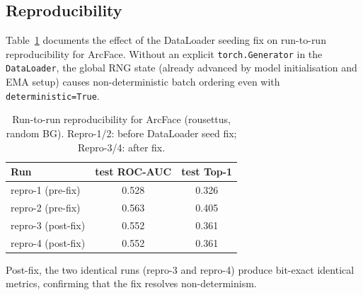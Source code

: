 \subsection{Reproducibility}

Table~\ref{tab:repro} documents the effect of the DataLoader seeding fix on run-to-run
reproducibility for ArcFace.  Without an explicit \texttt{torch.Generator} in the
\texttt{DataLoader}, the global RNG state (already advanced by model initialisation and
EMA setup) causes non-deterministic batch ordering even with \texttt{deterministic=True}.

\begin{table}[h]
\centering
\caption{Run-to-run reproducibility for ArcFace (rousettus, random BG).
Repro-1/2: before DataLoader seed fix; Repro-3/4: after fix.}
\label{tab:repro}
\begin{tabular}{lcc}
\toprule
Run & test ROC-AUC & test Top-1 \\
\midrule
repro-1 (pre-fix)   & 0.528 & 0.326 \\
repro-2 (pre-fix)   & 0.563 & 0.405 \\
repro-3 (post-fix)  & 0.552 & 0.361 \\
repro-4 (post-fix)  & 0.552 & 0.361 \\
\bottomrule
\end{tabular}
\end{table}

Post-fix, the two identical runs (repro-3 and repro-4) produce bit-exact identical metrics,
confirming that the fix resolves non-determinism.
